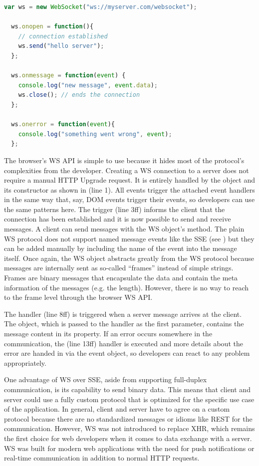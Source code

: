 \begin{lstlisting}[language=JavaScript, caption=Connecting to and using Websockets, label=lst:websockets]
  var ws = new WebSocket("ws://myserver.com/websocket");
  
  ws.onopen = function(){
    // connection established
    ws.send("hello server");
  };

  ws.onmessage = function(event) {
    console.log("new message", event.data);
    ws.close(); // ends the connection
  };

  ws.onerror = function(event){
    console.log("something went wrong", event);
  };
\end{lstlisting}

The browser's WS API is simple to use because it hides most of the protocol's complexities from the developer. Creating a WS connection to a server does not require a manual HTTP Upgrade request. It is entirely handled by the  object and its constructor as shown in  (line 1). All events trigger the attached event handlers in the same way that, say, DOM events trigger their events, so developers can use the same patterns here. The  trigger (line 3ff) informs the client that the connection has been established and it is now possible to send and receive messages. A client can send messages with the WS object's  method. The plain WS protocol does not support named message events like the SSE (see ) but they can be added manually by including the name of the event into the message itself. Once again, the WS object abstracts greatly from the WS protocol because messages are internally sent as so-called ``frames'' instead of simple strings. Frames are binary messages that encapsulate the data and contain the meta information of the messages (e.g. the length)\cite[p. 43ff]{wang2013websockets}. However, there is no way to reach to the frame level through the browser WS API.

The  handler (line 8ff) is triggered when a server message arrives at the client. The  object, which is passed to the handler as the first parameter, contains the message content in its  property. If an error occurs somewhere in the communication, the  (line 13ff) handler is executed and more details about the error are handed in via the event object, so developers can react to any problem appropriately.

One advantage of WS over SSE, aside from supporting full-duplex communication, is its capability to send binary data. This means that client and server could use a fully custom protocol that is optimized for the specific use case of the application. In general, client and server have to agree on a custom protocol because there are no standardized messages or idioms like REST for the communication. However, WS was not introduced to replace XHR, which remains the first choice for web developers when it comes to data exchange with a server. WS was built for modern web applications with the need for push notifications or real-time communication in addition to normal HTTP requests.